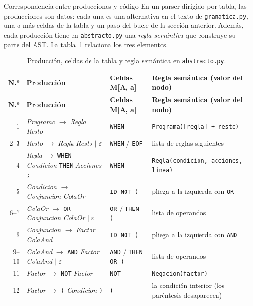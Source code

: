 \documentclass[11pt,letterpaper]{article}
\makeatletter
\renewcommand\subsection{\@startsection{subsection}{2}{\z@}{-2.6ex\@plus -1ex \@minus -.2ex}{1.0ex \@plus .2ex}%
  {\normalfont\large\bfseries}}
\newcommand{\cod}[1]{\texttt{#1}}
\newcommand{\T}[1]{\texttt{#1}}
\newcommand{\NT}[1]{\textit{#1}}
\newcommand{\eps}{\ensuremath{\varepsilon}}
\newcommand{\flecha}{\ensuremath{\rightarrow}}
\newcommand{\cabeza}{\rowcolor{cabecera}}
\makeatother
\begin{document}
\subsection{Correspondencia entre producciones y código}
En un parser dirigido por tabla, las producciones son datos: cada una es una alternativa en el texto de
\cod{gramatica.py}, una o más celdas de la tabla y un paso del bucle de la sección anterior. Además, cada producción
tiene en \cod{abstracto.py} una \emph{regla semántica} que construye su parte del AST. La tabla~\ref{tab:semantica}
relaciona los tres elementos.

\begin{longtable}{r>{\raggedright}p{6.0cm}>{\raggedright}p{2.8cm}>{\raggedright\arraybackslash}p{5.5cm}}
\caption{Producción, celdas de la tabla y regla semántica en \cod{abstracto.py}.}\label{tab:semantica}\\
\hline\cabeza \textbf{N.º} & \textbf{Producción} & \textbf{Celdas M[A, a]} & \textbf{Regla semántica (valor del nodo)}\\\hline\endfirsthead
\hline\cabeza \textbf{N.º} & \textbf{Producción} & \textbf{Celdas M[A, a]} & \textbf{Regla semántica (valor del nodo)}\\\hline\endhead
1 & \NT{Programa} \flecha{} \NT{Regla} \NT{Resto} & \T{WHEN} & \T{Programa([regla] + resto)}\\
2--3 & \NT{Resto} \flecha{} \NT{Regla} \NT{Resto} $\mid$ \eps & \T{WHEN} / \T{EOF} & lista de reglas siguientes\\
4 & \NT{Regla} \flecha{} \T{WHEN} \NT{Condicion} \T{THEN} \NT{Acciones} \T{;} & \T{WHEN} & \T{Regla(condición, acciones, línea)}\\
5 & \NT{Condicion} \flecha{} \NT{Conjuncion} \NT{ColaOr} & \T{ID NOT (} & pliega a la izquierda con \T{OR}\\
6--7 & \NT{ColaOr} \flecha{} \T{OR} \NT{Conjuncion} \NT{ColaOr} $\mid$ \eps & \T{OR} / \T{THEN )} & lista de operandos\\
8 & \NT{Conjuncion} \flecha{} \NT{Factor} \NT{ColaAnd} & \T{ID NOT (} & pliega a la izquierda con \T{AND}\\
9--10 & \NT{ColaAnd} \flecha{} \T{AND} \NT{Factor} \NT{ColaAnd} $\mid$ \eps & \T{AND} / \T{THEN OR )} & lista de operandos\\
11 & \NT{Factor} \flecha{} \T{NOT} \NT{Factor} & \T{NOT} & \T{Negacion(factor)}\\
12 & \NT{Factor} \flecha{} \T{(} \NT{Condicion} \T{)} & \T{(} & la condición interior (los paréntesis desaparecen)\\

\end{longtable}
\end{document}
